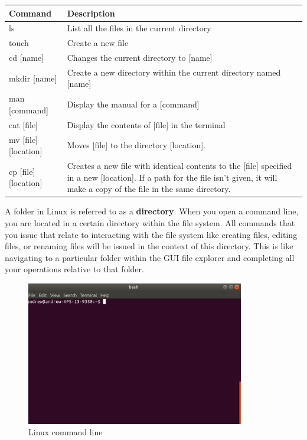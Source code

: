 \begin{center}
    \begin{tabular}{| l | p{75mm} | }
      \hline
      Command & Description \\ \hline
      ls & List all the files in the current directory \\ \hline
      touch & Create a new file \\ \hline
      cd [name] & Changes the current directory to [name] \\ \hline
      mkdir [name] & Create a new directory within the current directory named [name] \\ \hline
      man [command] & Display the manual for a [command] \\ \hline
      cat [file] & Display the contents of [file] in the terminal \\ \hline
      mv [file] [location] & Moves [file] to the directory [location]. \\ \hline 
      cp [file] [location] & Creates a new file with identical contents to the [file] specified in a new [location]. If a path for the file isn’t given, it will make a copy of the file in the same directory. \\ \hline
    \end{tabular}
\end{center}
  
  A folder in Linux is referred to as a \textbf{directory}. When you open a command line, you are located in a certain directory within the file system. All commands that you issue that relate to interacting with the file system like creating files, editing files, or renaming files will be issued in the context of this directory. This is like navigating to a particular folder within the GUI file explorer and completing all your operations relative to that folder.

\begin{figure}
	\centering
	\includegraphics[width=0.85\textwidth]{images/commandLineOne.png}
	\caption{Linux command line}
	\label{fig:linux:one}
\end{figure}

